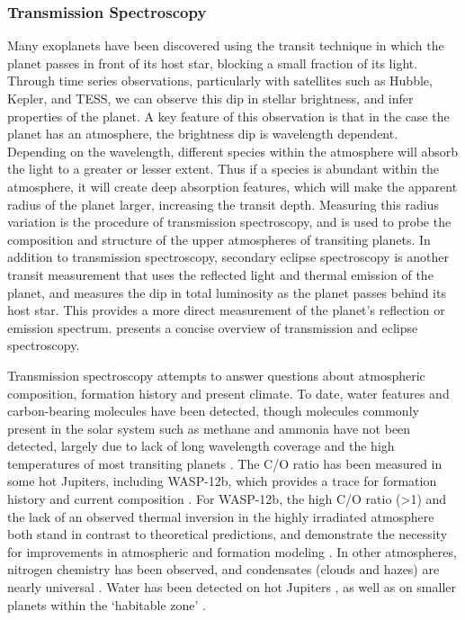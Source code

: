 \subsubsection{Transmission Spectroscopy}
Many exoplanets have been discovered using the transit technique in which the planet passes in front of its host star, blocking a small fraction of its light.
Through time series observations, particularly with satellites such as Hubble, Kepler, and TESS, we can observe this dip in stellar brightness, and infer properties of the planet.
A key feature of this observation is that in the case the planet has an atmosphere, the brightness dip is wavelength dependent.
Depending on the wavelength, different species within the atmosphere will absorb the light to a greater or lesser extent.
Thus if a species is abundant within the atmosphere, it will create deep absorption features, which will make the apparent radius of the planet larger, increasing the transit depth.
Measuring this radius variation is the procedure of transmission spectroscopy, and is used to probe the composition and structure of the upper atmospheres of transiting planets.
In addition to transmission spectroscopy, secondary eclipse spectroscopy is another transit measurement that uses the reflected light and thermal emission of the planet, and measures the dip in total luminosity as the planet passes behind its host star.
This provides a more direct measurement of the planet's reflection or emission spectrum.
\parencite{Kreidberg2018} presents a concise overview of transmission and eclipse spectroscopy.

Transmission spectroscopy attempts to answer questions about atmospheric composition, formation history and present climate.
To date, water features and carbon-bearing molecules have been detected, though molecules commonly present in the solar system such as methane and ammonia have not been detected, largely due to lack of long wavelength coverage and the high temperatures of most transiting planets \parencite{Lee2012,Kreidberg2018}.
The C/O ratio has been measured in some hot Jupiters, including WASP-12b, which provides a trace for formation history and current composition \parencite{Madhusudhan2011}. 
For WASP-12b, the high C/O ratio (>1) and the lack of an observed thermal inversion in the highly irradiated atmosphere both stand in contrast to theoretical predictions, and demonstrate the necessity for improvements in atmospheric and formation modeling \parencite{Madhusudhan2011}.
In other atmospheres, nitrogen chemistry has been observed, and condensates (clouds and hazes) are nearly universal \parencite{MacDonald2017}.
Water has been detected on hot Jupiters \parencite{Kreidberg2014}, as well as on smaller planets within the `habitable zone' \parencite{Benneke2019,Tsiaras2019}.

